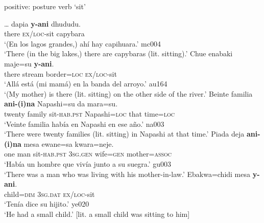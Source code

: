 \documentclass[output=paper]{langsci/langscibook}
\begin{document}
\begin{exe}\ex\label{ex:tacana-posture-sit} positive: posture verb `sit' 
\begin{xlist}
\ex\label{ex:tacana-posture-sit-capybaras}
\gll \ldots{} dapia \textbf{y-ani} dhududu.\\
    {}  there  \textsc{ex/loc}-sit  capybara\\
\glt `(En los lagos grandes,) ahí hay capihuara.' mc004\\
`There (in the big lakes,) there are capybaras (lit. sitting).'
\ex\label{ex:tacana-posture-sit-mother}
\gll {}Chue enabaki maje=su{\cb} \textbf{y-ani}.\\
    there  stream  border=\textsc{loc}  \textsc{ex/loc}-sit\\
\glt `Allá está (mi mamá) en la banda del arroyo.' au164\\
`(My mother) is there (lit. sitting) on the other side of the river.' 
\ex\label{ex:tacana-posture-sit-families}
\gll {}Beinte familia{\cb} \textbf{ani-(i)na} Napashi=su {\ob}da
mara=su{\cb}.\\
    twenty  family  sit-\textsc{hab.pst}
    Napashi=\textsc{loc}  that  time=\textsc{loc}\\
\glt `Veinte familia había en Napashi en ese año.' na003\\
`There were twenty families (lit. sitting) in Napashi at that time.'
\ex\label{ex:tacana-posture-sit-anoppi}
 \gll {}Piada deja{\cb} \textbf{ani-(i)na}
    mesa ewane=sa kwara=neje{\cb}.\\
    one  man  sit-\textsc{hab.pst}  \textsc{3sg.gen}
    wife=\textsc{gen}  mother=\textsc{assoc}\\
\glt `Había un hombre que vivía junto a su suegra.' gu003\\
`There was a man who was living with his mother-in-law.'
\ex\label{ex:tacana-posture-sit-child}
 \gll {}Ebakwa=chidi mesa
    \textbf{y-ani}.\\
 child=\textsc{dim}  \textsc{3sg.dat}  \textsc{ex/loc}-sit\\
\glt `Tenía dice su hijito.' ye020\\
`He had a small child.' [lit. a small child was sitting to him]
\end{xlist}


\end{exe}
\end{document}

